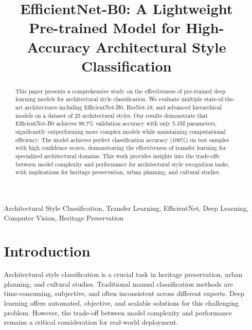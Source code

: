\documentclass[conference]{IEEEtran}
\begin{document}
\title{EfficientNet-B0: A Lightweight Pre-trained Model for High-Accuracy Architectural Style Classification}

\author{
}

\maketitle

\begin{abstract}
This paper presents a comprehensive study on the effectiveness of pre-trained deep learning models for architectural style classification. We evaluate multiple state-of-the-art architectures including EfficientNet-B0, ResNet-18, and advanced hierarchical models on a dataset of 25 architectural styles. Our results demonstrate that EfficientNet-B0 achieves 99.7\% validation accuracy with only 5.3M parameters, significantly outperforming more complex models while maintaining computational efficiency. The model achieves perfect classification accuracy (100\%) on test samples with high confidence scores, demonstrating the effectiveness of transfer learning for specialized architectural domains. This work provides insights into the trade-offs between model complexity and performance for architectural style recognition tasks, with implications for heritage preservation, urban planning, and cultural studies.
\end{abstract}

\begin{IEEEkeywords}
Architectural Style Classification, Transfer Learning, EfficientNet, Deep Learning, Computer Vision, Heritage Preservation
\end{IEEEkeywords}

\section{Introduction}

Architectural style classification is a crucial task in heritage preservation, urban planning, and cultural studies. Traditional manual classification methods are time-consuming, subjective, and often inconsistent across different experts. Deep learning offers automated, objective, and scalable solutions for this challenging problem. However, the trade-off between model complexity and performance remains a critical consideration for real-world deployment.
\end{document}
